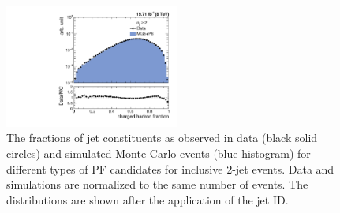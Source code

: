 \begin{figure}[!htbp]
\begin{center}
 \vspace*{1mm}
 \includegraphics[width=0.51\textwidth]{Plots_HT_2_150/Comparison_ChHadFrac_2_HT_2_150.pdf}
 \caption{The fractions of jet constituents as observed in data (black solid circles) and simulated Monte Carlo events (blue histogram) for different types of PF candidates for inclusive 2-jet events. Data and simulations are normalized to the same number of events. The distributions are shown after the application of the jet ID.}
 \label{fig:qual2}
 \end{center}
\end{figure} 

